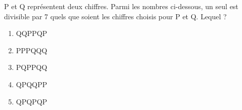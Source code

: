 P et Q représentent deux chiffres. Parmi les nombres ci-dessous, un
seul est divisible par 7 quels que soient les chiffres choisis pour P
et Q. Lequel ?
\begin{multicols}{5}
  \begin{enumerate}[A/]
  \item QQPPQP
  \item PPPQQQ
  \item PQPPQQ
  \item QPQQPP
  \item QPQPQP
  \end{enumerate}
\end{multicols}